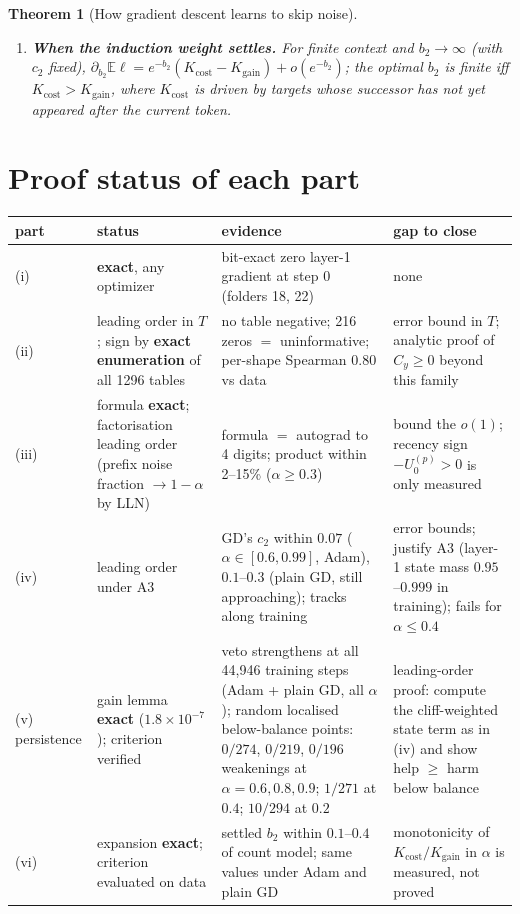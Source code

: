 \documentclass[11pt]{article}
\newtheorem{theorem}{Theorem}
\theoremstyle{definition}\newtheorem{assumption}{Assumption}
\theoremstyle{remark}\newtheorem{remark}{Remark}
\newcommand{\1}{\mathbf{1}}
\begin{document}
\begin{theorem}[How gradient descent learns to skip noise]
\begin{enumerate}[label=(\roman*),leftmargin=2em]
\item \textbf{When the induction weight settles.} For finite context and $b_2\to\infty$ (with $c_2$
fixed), $\partial_{b_2}\mathbb E\ell=e^{-b_2}(K_{\mathrm{cost}}-K_{\mathrm{gain}})+o(e^{-b_2})$; the
optimal $b_2$ is finite iff $K_{\mathrm{cost}}>K_{\mathrm{gain}}$, where $K_{\mathrm{cost}}$ is driven by
targets whose successor has not yet appeared after the current token.
\end{enumerate}
\end{theorem}

\section{Proof status of each part}
\begin{center}\small
\begin{tabular}{p{1.1cm}p{4.3cm}p{4.6cm}p{4.2cm}}\toprule
part & status & evidence & gap to close\\\midrule
(i) & \textbf{exact}, any optimizer & bit-exact zero layer-1 gradient at step 0 (folders 18, 22) & none \\
(ii) & leading order in $T$; sign by \textbf{exact enumeration} of all 1296 tables & no table negative; 216 zeros $=$ uninformative; per-shape Spearman 0.80 vs data & error bound in $T$; analytic proof of $C_y\ge0$ beyond this family \\
(iii) & formula \textbf{exact}; factorisation leading order (prefix noise fraction $\to1-\alpha$ by LLN) & formula $=$ autograd to 4 digits; product within 2--15\% ($\alpha\ge0.3$) & bound the $o(1)$; recency sign $-U_0^{(p)}>0$ is only measured \\
(iv) & leading order under A3 & GD's $c_2$ within $0.07$ ($\alpha\in[0.6,0.99]$, Adam), $0.1$--$0.3$ (plain GD, still approaching); tracks along training & error bounds; justify A3 (layer-1 state mass $0.95$--$0.999$ in training); fails for $\alpha\le0.4$ \\
(v) persistence & gain lemma \textbf{exact} ($1.8\times10^{-7}$); criterion verified & veto strengthens at all 44,946 training steps (Adam + plain GD, all $\alpha$); random localised below-balance points: $0/274$, $0/219$, $0/196$ weakenings at $\alpha=0.6,0.8,0.9$; $1/271$ at $0.4$; $10/294$ at $0.2$ & leading-order proof: compute the cliff-weighted state term as in (iv) and show help $\ge$ harm below balance \\
(vi) & expansion \textbf{exact}; criterion evaluated on data & settled $b_2$ within $0.1$--$0.4$ of count model; same values under Adam and plain GD & monotonicity of $K_{\mathrm{cost}}/K_{\mathrm{gain}}$ in $\alpha$ is measured, not proved \\
\bottomrule\end{tabular}\end{center}
\end{document}
